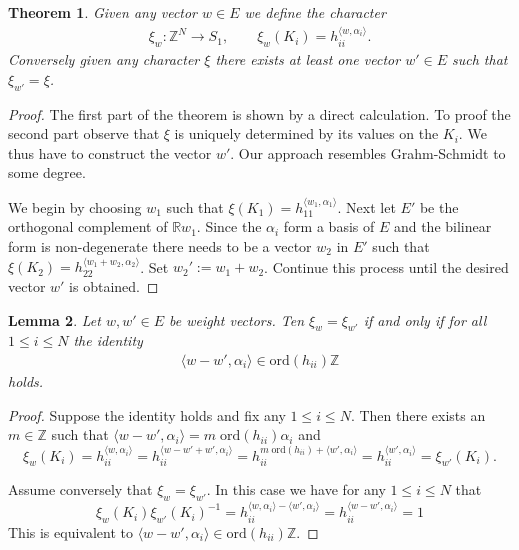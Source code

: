 \documentclass{amsart}
\newtheorem{theorem}{Theorem}[section]
\newtheorem{lemma}[theorem]{Lemma}
\theoremstyle{definition}
\begin{document}
\begin{theorem}
	Given any vector $w\in E$ we define the character
	\begin{align}
		\xi_w: \mathbb Z^N \rightarrow S_1, \qquad  \xi_w(K_i) = h_{ii}^{ \langle w, \alpha_i \rangle}.
	\end{align}
	Conversely given any character $\xi$ there exists at least one vector $w' \in E$ such that $\xi_{w'} = \xi$.
\end{theorem}
\begin{proof}
	The first part of the theorem is shown by a direct calculation.
	To proof the second part observe that $\xi$ is uniquely determined by its values on the $K_i$.
	We thus have to construct the vector $w'$. Our approach resembles Grahm-Schmidt to some degree.
	
	We begin by choosing $w_1$ such that $\xi(K_1) = h_{11}^{\langle w_1, \alpha_1 \rangle }$.
	Next let $E'$ be the orthogonal complement of $\mathbb R w_1$.
	Since the $\alpha_i$ form a basis of $E$ and the bilinear form is non-degenerate there needs to be a vector $w_2$ in $E'$ such that
	$\xi(K_2) = h_{22}^{\langle w_1 + w_2, \alpha_2 \rangle }$.
	Set $w_2' := w_1+ w_2$.
	Continue this process until the desired vector $w'$ is obtained.
\end{proof}


\begin{lemma}\label{lem: EqualWeights}
	Let $w, w' \in E$ be weight vectors.
	Ten $\xi_w = \xi_{w'}$ if and only if for all $1 \leq i \leq N$ the identity 
	\begin{align}
		\langle w- w', \alpha_i \rangle  \in \text{ord}(h_{ii}) \mathbb Z
	\end{align}
	holds.
\end{lemma}
\begin{proof}
	Suppose the identity holds and fix any $1 \leq i \leq N$. Then
	there exists an $m \in \mathbb Z $ such that $	\langle w- w', \alpha_i \rangle = m\;\text{ord}(h_{ii})\alpha_i$ and 
	$$
	\xi_{w}(K_i) = 
	h_{ii}^{\langle w, \alpha_i \rangle } =
	h_{ii}^{\langle w- w' + w', \alpha_i \rangle } =
	h_{ii}^{m \;\text{ord}(h_{ii}) + \langle w', \alpha_i \rangle } =
	h_{ii}^{\langle w' , \alpha_i \rangle } =
	\xi_{w'}(K_i).
	$$
	
	Assume conversely that $\xi_w = \xi_{w'}$.
	In this case we have for any $1\leq i \leq N$ that
	$$
	\xi_w(K_i) \xi_{w'}(K_i)^{-1} = 
	h_{ii}^{\langle w, \alpha_i \rangle - \langle w', \alpha_i \rangle } =
	h_{ii}^{\langle w - w', \alpha_i \rangle } =		
	1	
	$$
	This is equivalent to 
	$ \langle w - w', \alpha_i \rangle \in \text{ord}(h_{ii}) \mathbb Z$.
\end{proof}
\end{document}

